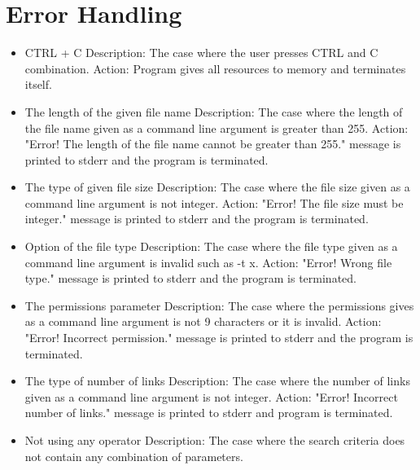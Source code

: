 \documentclass{article}
\begin{document}
\section{Error Handling}

\begin{itemize}
\item CTRL + C
\newline
Description: The case where the user presses CTRL and C combination.
\newline
Action: Program gives all resources to memory and terminates itself.
\item The length of the given file name
\newline
Description: The case where the length of the file name given as a command line argument is greater than 255.
\newline
Action: "Error! The length of the file name cannot be greater than 255." message is printed to stderr and the program is terminated.
\item The type of given file size
\newline
Description: The case where the file size given as a command line argument is not integer.
\newline
Action: "Error! The file size must be integer." message is printed to stderr and the program is terminated.
\item Option of the file type
\newline
Description: The case where the file type given as a command line argument is invalid such as -t x.
\newline
Action: "Error! Wrong file type." message is printed to stderr and the program is terminated. 
\item The permissions parameter
\newline
Description: The case where the permissions gives as a command line argument is not 9 characters or it is invalid.
\newline
Action: "Error! Incorrect permission." message is printed to stderr and the program is terminated.
\item The type of number of links
\newline
Description: The case where the number of links given as a command line argument is not integer.
\newline
Action: "Error! Incorrect number of links." message is printed to stderr and program is terminated.
\item Not using any operator
\newline
Description: The case where the search criteria does not contain any combination of parameters.

\end{itemize}
\end{document}
